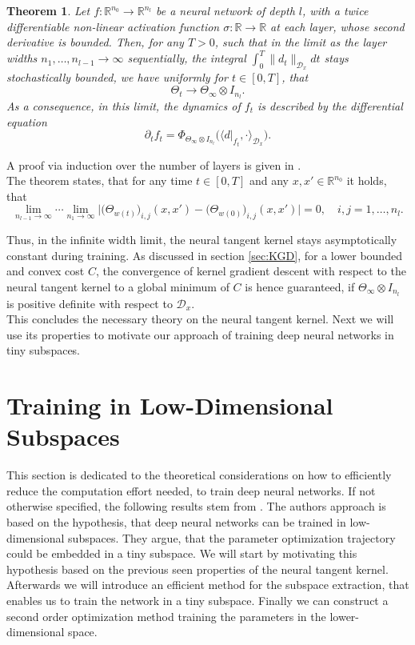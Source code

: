 \documentclass[11pt, a4paper]{article}
\newtheorem{theorem}{Theorem}[section]
\newcommand{\R}{\mathbb{R}}
\newcommand{\D}{\mathcal{D}}
\begin{document}
\begin{theorem}
Let $f: \R^{n_0} \to \R^{n_l}$ be a neural network of depth $l$, with a twice differentiable non-linear activation function $\sigma : \R \to \R$ at each layer, whose second derivative is bounded. Then, for any $T>0$, such that in the limit as the layer widths $n_1, \dots, n_{l-1} \to \infty$ sequentially, the integral $\int_{0}^{T} \| d_t \|_{\D_x}dt$ stays stochastically bounded, we have uniformly for $t \in [0,T]$, that
\[ \Theta_t \to \Theta_{\infty} \otimes I_{n_l}. \]
As a consequence, in this limit, the dynamics of $f_t$ is described by the differential equation
\[ \partial_tf_t = \Phi_{\Theta_{\infty} \otimes I_{n_l}} \Big ( \big \langle d|_{f_t}, \cdot \big \rangle_{\D_x} \Big ). \]
\end{theorem}

A proof via induction over the number of layers is given in \cite{NTK}. \\

The theorem states, that for any time $t \in [0,T]$ and any $x,x' \in \R^{n_0}$ it holds, that
\[ \lim_{n_{l-1} \to \infty} \cdots \lim_{n_1 \to \infty} \Big | \big (\Theta_{w(t)} \big )_{i,j}(x,x') - \big (\Theta_{w(0)} \big )_{i,j}(x,x') \Big | = 0, \quad i,j=1,\dots,n_l. \]

Thus, in the infinite width limit, the neural tangent kernel stays asymptotically constant during training. As discussed in section \ref{sec:KGD}, for a lower bounded and convex cost $C$, the convergence of kernel gradient descent with respect to the neural tangent kernel to a global minimum of $C$ is hence guaranteed, if $\Theta_{\infty} \otimes I_{n_l}$ is positive definite with respect to $\D_x$. \\

This concludes the necessary theory on the neural tangent kernel. Next we will use its properties to motivate our approach of training deep neural networks in tiny subspaces.

\pagebreak
\section{Training in Low-Dimensional Subspaces}

This section is dedicated to the theoretical considerations on how to efficiently reduce the computation effort needed, to train deep neural networks. If not otherwise specified, the following results stem from \cite{Paper}. The authors approach is based on the hypothesis, that deep neural networks can be trained in low-dimensional subspaces. They argue, that the parameter optimization trajectory could be embedded in a tiny subspace. We will start by motivating this hypothesis based on the previous seen properties of the neural tangent kernel. Afterwards we will introduce an efficient method for the subspace extraction, that enables us to train the network in a tiny subspace. Finally we can construct a second order optimization method training the parameters in the lower-dimensional space.
\end{document}
